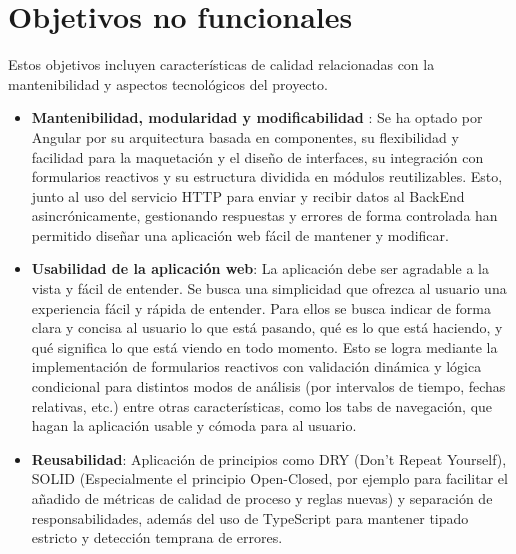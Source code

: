 \section{Objetivos no funcionales}

Estos objetivos incluyen características de calidad relacionadas con la mantenibilidad y aspectos tecnológicos del proyecto.

\begin{itemize}
  \item \textbf{Mantenibilidad, modularidad y modificabilidad }: Se ha optado por Angular por su arquitectura basada en componentes, su flexibilidad y facilidad para la maquetación y el diseño de interfaces, su integración con formularios reactivos y su estructura dividida en módulos reutilizables. Esto, junto al uso del servicio HTTP para enviar y recibir datos al BackEnd asincrónicamente, gestionando respuestas y errores de forma controlada han permitido diseñar una aplicación web fácil de mantener y modificar.
  
  \item \textbf{Usabilidad de la aplicación web}: La aplicación debe ser agradable a la vista y fácil de entender. Se busca una simplicidad que ofrezca al usuario una experiencia fácil y rápida de entender. Para ellos se busca indicar de forma clara y concisa al usuario lo que está pasando, qué es lo que está haciendo, y qué significa lo que está viendo en todo momento. Esto se logra mediante la implementación de formularios reactivos con validación dinámica y lógica condicional para distintos modos de análisis (por intervalos de tiempo, fechas relativas, etc.) entre otras características, como los tabs de navegación, que hagan la aplicación usable y cómoda para al usuario.

  \item \textbf{Reusabilidad}: Aplicación de principios como DRY (Don't Repeat Yourself), SOLID (Especialmente el principio Open-Closed, por ejemplo para facilitar el añadido de métricas de calidad de proceso y reglas nuevas) y separación de responsabilidades, además del uso de TypeScript para mantener tipado estricto y detección temprana de errores.


\end{itemize}